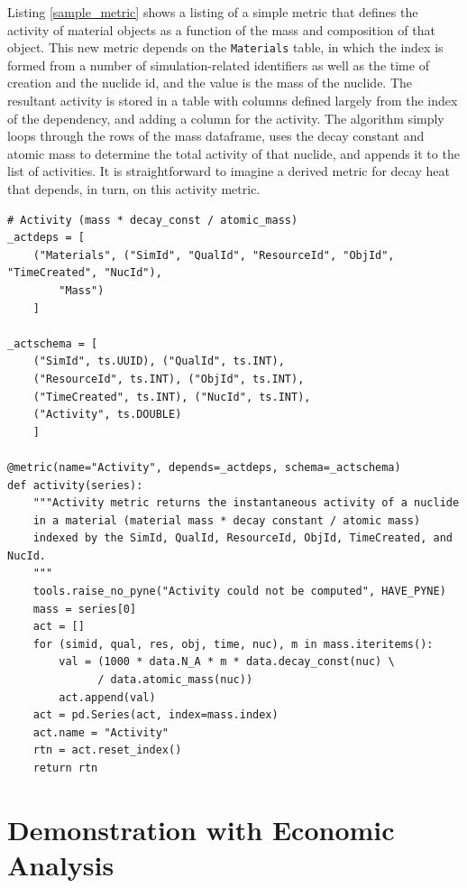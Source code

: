 Listing \ref{sample_metric} shows a listing of a simple metric that defines
the activity of material objects as a function of the mass and composition of
that object.  This new metric depends on the \texttt{Materials} table, in
which the index is formed from a number of simulation-related identifiers as
well as the time of creation and the nuclide id, and the value is the mass of
the nuclide.  The resultant activity is stored in a table with columns defined
largely from the index of the dependency, and adding a column for the
activity.  The algorithm simply loops through the rows of the mass dataframe,
uses the decay constant and atomic mass to determine the total activity of
that nuclide, and appends it to the list of activities.  It is straightforward
to imagine a derived metric for decay heat that depends, in turn, on this
activity metric.

\begin{lstlisting}[caption={A sample derived metric in Cymetric}, 
                   label=sample_metric]
# Activity (mass * decay_const / atomic_mass)
_actdeps = [
    ("Materials", ("SimId", "QualId", "ResourceId", "ObjId", "TimeCreated", "NucId"),
        "Mass")
    ]

_actschema = [
    ("SimId", ts.UUID), ("QualId", ts.INT),
    ("ResourceId", ts.INT), ("ObjId", ts.INT),
    ("TimeCreated", ts.INT), ("NucId", ts.INT),
    ("Activity", ts.DOUBLE)
    ]

@metric(name="Activity", depends=_actdeps, schema=_actschema)
def activity(series):
    """Activity metric returns the instantaneous activity of a nuclide
    in a material (material mass * decay constant / atomic mass)
    indexed by the SimId, QualId, ResourceId, ObjId, TimeCreated, and NucId.
    """
    tools.raise_no_pyne("Activity could not be computed", HAVE_PYNE)
    mass = series[0]
    act = []
    for (simid, qual, res, obj, time, nuc), m in mass.iteritems():
        val = (1000 * data.N_A * m * data.decay_const(nuc) \
              / data.atomic_mass(nuc))
        act.append(val)
    act = pd.Series(act, index=mass.index)
    act.name = "Activity"
    rtn = act.reset_index()
    return rtn
\end{lstlisting}

\section{Demonstration with Economic Analysis}

